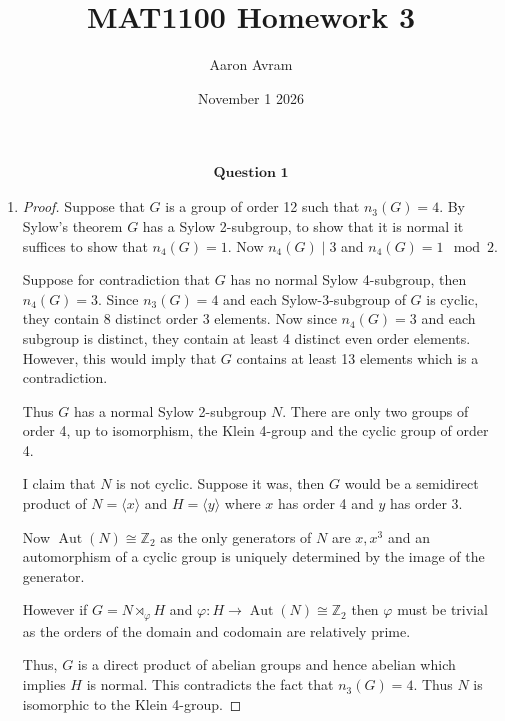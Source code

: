 \documentclass[12pt]{article}
\title{MAT1100 Homework 3}
\author{Aaron Avram}
\date{November 1 2026}
\begin{document}
\newtheorem{definition}{Definition}
\newtheorem{theorem}{Theorem}
\newtheorem{claim}{Claim}
\newtheorem{corollary}{Corollary}

\maketitle

\begin{align*}
    \textbf{Question 1}
\end{align*}

\begin{enumerate}
    \item[(a)]
    \begin{proof}
        Suppose that $G$ is a group of order 12 such that $n_3(G) = 4$.
        By Sylow's theorem $G$ has a Sylow 2-subgroup, to show that it is normal
        it suffices to show that $n_4(G) = 1$. Now $n_4(G) \mid 3$ and $n_4(G) = 1 \mod 2$.

        Suppose for contradiction that $G$ has no normal Sylow 4-subgroup, then $n_4(G) = 3$.
        Since $n_3(G) = 4$ and each Sylow-3-subgroup of $G$ is cyclic, they contain 8
        distinct order 3 elements. Now since $n_4(G) = 3$ and each subgroup is distinct,
        they contain at least 4 distinct even order elements. However, this would imply that
        $G$ contains at least 13 elements which is a contradiction.
        
        Thus $G$ has a normal Sylow 2-subgroup $N$. There are only two groups of order 4,
        up to isomorphism, the Klein 4-group and the cyclic group of order 4.

        I claim that $N$ is not cyclic. Suppose it was, then $G$ would be a semidirect product
        of $N = \langle x \rangle$ and $H = \langle y \rangle$ where $x$ has order 4 and $y$ has order 3.

        Now $\operatorname{Aut}(N) \cong \mathbb Z_2$ as the only generators of $N$ are $x, x^3$
        and an automorphism of a cyclic group is uniquely determined by the image of the generator.

        However if $G = N \rtimes_\varphi H$ and $\varphi: H \to \operatorname{Aut}(N) \cong \mathbb Z_2$
        then $\varphi$ must be trivial as the orders of the domain and codomain are relatively prime.

        Thus, $G$ is a direct product of abelian groups and hence abelian which implies $H$ is normal.
        This contradicts the fact that $n_3(G) = 4$. Thus $N$ is isomorphic to the Klein 4-group.


\end{proof}
\end{enumerate}
\end{document}
